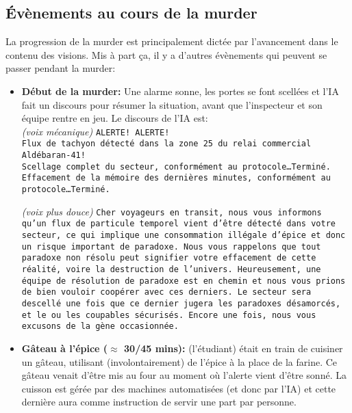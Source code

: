 {	
	\subsection{Évènements au cours de la murder}
	
	\par La progression de la murder est principalement dictée par l'avancement dans le contenu des visions. Mis à part ça, il y a d'autres évènements qui peuvent se passer pendant la murder:
	\begin{itemize}
		\item \textbf{Début de la murder:} Une alarme sonne, les portes se font scellées et l'IA fait un discours pour résumer la situation, avant que l'inspecteur et son équipe rentre en jeu. Le discours de l'IA est:\\
		\emph{(voix mécanique)} \texttt{ALERTE! ALERTE!}\\
		\texttt{Flux de tachyon détecté dans la zone 25 du relai commercial Aldébaran-41!}\\
		\texttt{Scellage complet du secteur, conformément au protocole\dots Terminé.}\\
		\texttt{Effacement de la mémoire des dernières minutes, conformément au protocole\dots Terminé.}
		
		\emph{(voix plus douce)}
		\texttt{Cher voyageurs en transit, nous vous informons qu'un flux de particule temporel vient d'être détecté dans votre secteur, ce qui implique une consommation illégale d'épice et donc un risque important de paradoxe. Nous vous rappelons que tout paradoxe non résolu peut signifier votre effacement de cette réalité, voire la destruction de l'univers. Heureusement, une équipe de résolution de paradoxe est en chemin et nous vous prions de bien vouloir coopérer avec ces derniers. Le secteur sera descellé une fois que ce dernier jugera les paradoxes désamorcés, et le ou les coupables sécurisés. Encore une fois, nous vous excusons de la gène occasionnée.}
		
		
		\item \textbf{Gâteau à l'épice ($\approx$ 30/45 mins):} \nmPlayerIII (l'étudiant) était en train de cuisiner un gâteau, utilisant (involontairement) de l'épice à la place de la farine. Ce gâteau venait d'être mis au four au moment où l'alerte vient d'être sonné. La cuisson est gérée par des machines automatisées (et donc par l'IA) et cette dernière aura comme instruction de servir une part par personne.
		

\end{itemize}}
